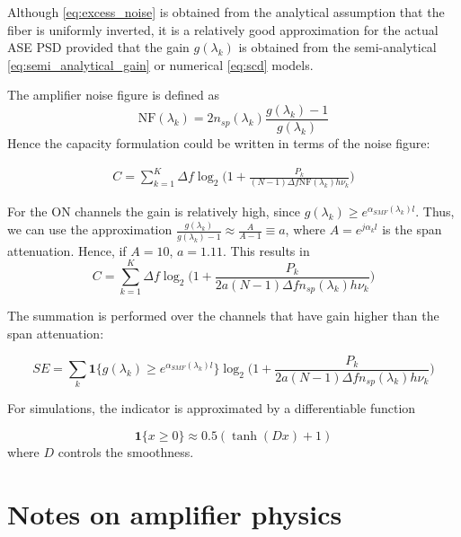 \documentclass[a4paper]{article}
\begin{document}
Although \eqref{eq:excess_noise} is obtained from the analytical assumption that the fiber is uniformly inverted, it is a relatively good approximation for the actual ASE PSD provided that the gain $g(\lambda_k)$ is obtained from the semi-analytical \eqref{eq:semi_analytical_gain} or numerical \eqref{eq:scd} models. 

The amplifier noise figure is defined as
\begin{equation} \label{eq:NF}
	\mathrm{NF}(\lambda_k) = 2n_{sp}(\lambda_k)\frac{g(\lambda_k)-1}{g(\lambda_k)}
\end{equation}
Hence the capacity formulation could be written in terms of the noise figure:

\begin{align}\label{eq:capacity_NF}
C =\sum_{k = 1}^{K} \Delta f\log_2\bigg(1 + \frac{P_k}{(N-1)\Delta f\mathrm{NF}(\lambda_k)h\nu_k}\bigg) 
\end{align}

For the ON channels the gain is relatively high, since $g(\lambda_k) \geq e^{\alpha_{SMF}(\lambda_k)l}$. Thus, we can use the approximation $\frac{g(\lambda_k)}{g(\lambda_k)-1} \approx \frac{A}{A-1} \equiv a$, where $A = e^{j\alpha_kl}$ is the span attenuation. Hence, if $A = 10$, $a = 1.11$. This results in
\begin{equation}
	C =\sum_{k = 1}^{K} \Delta f\log_2\bigg(1 + \frac{P_k}{2a(N-1)\Delta fn_{sp}(\lambda_k)h\nu_k}\bigg) 
\end{equation}

The summation is performed over the channels that have gain higher than the span attenuation:

\begin{equation}
SE =\sum_{k} \bm{1}\{g(\lambda_k) \geq e^{\alpha_{SMF}(\lambda_k)l}\}\log_2\bigg(1 + \frac{P_k}{2a(N-1)\Delta fn_{sp}(\lambda_k)h\nu_k}\bigg) 
\end{equation}

For simulations, the indicator is approximated by a differentiable function

\begin{equation}
	\bm{1}\{x \geq 0\} \approx 0.5(\tanh(Dx) + 1)
\end{equation}
where $D$ controls the smoothness.

\newpage
\section{Notes on amplifier physics}
\end{document}
